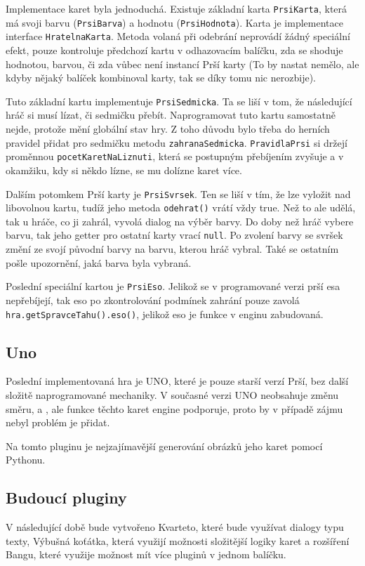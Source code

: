 Implementace karet byla jednoduchá. Existuje základní karta \texttt{PrsiKarta}, která má svoji barvu (\texttt{PrsiBarva}) a hodnotu (\texttt{PrsiHodnota}). Karta je implementace interface \texttt{HratelnaKarta}. Metoda volaná při odebrání neprovádí žádný speciální efekt, pouze kontroluje předchozí kartu v odhazovacím balíčku, zda se shoduje hodnotou, barvou, či zda vůbec není instancí Prší karty (To by nastat nemělo, ale kdyby nějaký balíček kombinoval karty, tak se díky tomu nic nerozbije).

Tuto základní kartu implementuje \texttt{PrsiSedmicka}. Ta se liší v tom, že následující hráč si musí lízat, či sedmičku přebít. Naprogramovat tuto kartu samostatně nejde, protože mění globální stav hry. Z toho důvodu bylo třeba do herních pravidel přidat pro sedmičku metodu \texttt{zahranaSedmicka}. \texttt{PravidlaPrsi} si držejí proměnnou \texttt{pocetKaretNaLiznuti}, která se postupným přebíjením zvyšuje a v okamžiku, kdy si někdo lízne, se mu dolízne karet více.

Dalším potomkem Prší karty je \texttt{PrsiSvrsek}. Ten se liší v tím, že lze vyložit nad libovolnou kartu, tudíž jeho metoda \texttt{odehrat()} vrátí vždy true. Než to ale udělá, tak u hráče, co ji zahrál, vyvolá dialog na výběr barvy. Do doby než hráč vybere barvu, tak jeho getter pro ostatní karty vrací \texttt{null}. Po zvolení barvy se svršek změní ze svojí původní barvy na barvu, kterou hráč vybral. Také se ostatním pošle upozornění, jaká barva byla vybraná.

Poslední speciální kartou je \texttt{PrsiEso}. Jelikož se v programované verzi prší esa nepřebíjejí, tak eso po zkontrolování podmínek zahrání pouze zavolá \texttt{hra.getSpravceTahu().eso()}, jelikož eso je funkce v enginu zabudovaná.
\subsection{Uno}
Poslední implementovaná hra je UNO, které je pouze starší verzí Prší, bez další složitě naprogramované mechaniky. V současné verzi UNO neobsahuje změnu směru,  a , ale funkce těchto karet engine podporuje, proto by v případě zájmu nebyl problém je přidat.

Na tomto pluginu je nejzajímavější generování obrázků jeho karet pomocí Pythonu.

\subsection{Budoucí pluginy}
V následující době bude vytvořeno Kvarteto, které bude využívat dialogy typu texty, Výbušná koťátka, která využijí možnosti složitější logiky karet a rozšíření Bangu, které využije možnost mít více pluginů v jednom balíčku.

